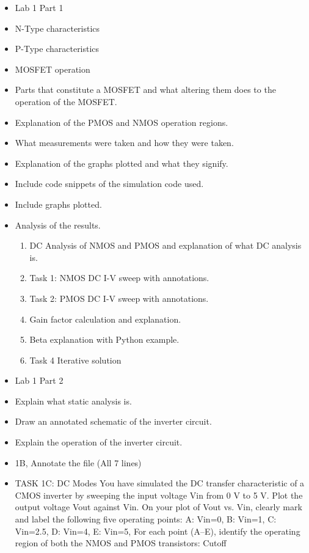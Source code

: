 \documentclass[a4paper,12pt]{article}
\begin{document}
\begin{itemize}
    \item Lab 1 Part 1
    \item N-Type characteristics
    \item P-Type characteristics
    \item MOSFET operation
    \item Parts that constitute a MOSFET and what altering them does to the operation of the MOSFET.
    \item Explanation of the PMOS and NMOS operation regions.
    \item What measurements were taken and how they were taken.
    \item Explanation of the graphs plotted and what they signify.
    \item Include code snippets of the simulation code used.
    \item Include graphs plotted.
    \item Analysis of the results.
    \begin{enumerate}
        \item DC Analysis of NMOS and PMOS and explanation of what DC analysis is.
        \item Task 1: NMOS DC I-V sweep with annotations.
        \item Task 2: PMOS DC I-V sweep with annotations.
        \item Gain factor calculation and explanation.
        \item Beta explanation with Python example.
        \item Task 4 Iterative solution
    \end{enumerate}
    \item Lab 1 Part 2
    \item Explain what static analysis is.
    \item Draw an annotated schematic of the inverter circuit.
    \item Explain the operation of the inverter circuit.
    \item 1B, Annotate the file (All 7 lines)
    \item TASK 1C: DC Modes You have simulated the DC transfer characteristic of a CMOS inverter by sweeping the input voltage Vin from 0 V to 5 V. Plot the 
    output voltage Vout against Vin. On your plot of Vout vs. Vin, clearly mark and label the following five operating points:
    A: Vin=0, B: Vin=1, C: Vin=2.5, D: Vin=4, E: Vin=5, For each point (A–E), identify the operating region of both the NMOS and PMOS transistors: Cutoff

\end{itemize}
\end{document}
